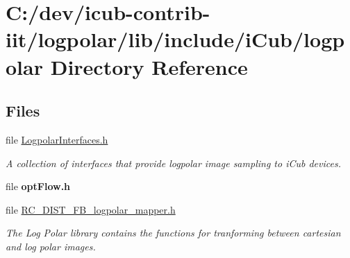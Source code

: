 \section{C\+:/dev/icub-\/contrib-\/iit/logpolar/lib/include/i\+Cub/logpolar Directory Reference}
\label{dir_91e39feb63cd5b600f38a08a13f12297}
\subsection*{Files}
\begin{DoxyCompactItemize}
\item 
file \hyperlink{LogpolarInterfaces_8h}{Logpolar\+Interfaces.\+h}
\begin{DoxyCompactList}\small\item\em A collection of interfaces that provide logpolar image sampling to i\+Cub devices. \end{DoxyCompactList}\item 
file {\bfseries opt\+Flow.\+h}
\item 
file \hyperlink{RC__DIST__FB__logpolar__mapper_8h}{R\+C\+\_\+\+D\+I\+S\+T\+\_\+\+F\+B\+\_\+logpolar\+\_\+mapper.\+h}
\begin{DoxyCompactList}\small\item\em The Log Polar library contains the functions for tranforming between cartesian and log polar images. \end{DoxyCompactList}\end{DoxyCompactItemize}
